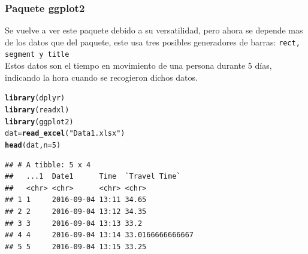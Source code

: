 \documentclass{article}\usepackage[]{graphicx}\usepackage[]{color}
\makeatletter
\newcommand{\hlnum}[1]{\textcolor[rgb]{0.686,0.059,0.569}{#1}}%
\newcommand{\hlstr}[1]{\textcolor[rgb]{0.192,0.494,0.8}{#1}}%
\newcommand{\hlstd}[1]{\textcolor[rgb]{0.345,0.345,0.345}{#1}}%
\newcommand{\hlkwb}[1]{\textcolor[rgb]{0.69,0.353,0.396}{#1}}%
\newcommand{\hlkwc}[1]{\textcolor[rgb]{0.333,0.667,0.333}{#1}}%
\newcommand{\hlkwd}[1]{\textcolor[rgb]{0.737,0.353,0.396}{\textbf{#1}}}%
\newenvironment{kframe}{%
 \def\at@end@of@kframe{}%
 \ifinner\ifhmode%
  \def\at@end@of@kframe{\end{minipage}}%
  \begin{minipage}{\columnwidth}%
 \fi\fi%
 \def\FrameCommand##1{\hskip\@totalleftmargin \hskip-\fboxsep
 \colorbox{shadecolor}{##1}\hskip-\fboxsep
     \hskip-\linewidth \hskip-\@totalleftmargin \hskip\columnwidth}%
 \MakeFramed {\advance\hsize-\width
   \@totalleftmargin\z@ \linewidth\hsize
   \@setminipage}}%
 {\par\unskip\endMakeFramed%
 \at@end@of@kframe}
\newenvironment{knitrout}{}{} %
\makeatother
\begin{document}
\subsubsection{Paquete ggplot2}
Se vuelve a ver este paquete\cite{docu_ggplot2}
debido a su versatilidad, pero ahora se depende mas de los datos que del paquete, este usa tres posibles generadores de barras: \texttt{rect, segment y title}~\\
Estos datos son el tiempo en movimiento de una persona durante 5 d\'ias, indicando la hora cuando se recogieron dichos datos.
\begin{knitrout}
\color{fgcolor}\begin{kframe}
\begin{alltt}
\hlkwd{library}\hlstd{(dplyr)}
\hlkwd{library}\hlstd{(readxl)}
\hlkwd{library}\hlstd{(ggplot2)}
\hlstd{dat} \hlkwb{=} \hlkwd{read_excel}\hlstd{(}\hlstr{"Data1.xlsx"}\hlstd{)}
\hlkwd{head}\hlstd{(dat,} \hlkwc{n}\hlstd{=}\hlnum{5}\hlstd{)}
\end{alltt}
\begin{verbatim}
## # A tibble: 5 x 4
##   ...1  Date1      Time  `Travel Time`   
##   <chr> <chr>      <chr> <chr>           
## 1 1     2016-09-04 13:11 34.65           
## 2 2     2016-09-04 13:12 34.35           
## 3 3     2016-09-04 13:13 33.2            
## 4 4     2016-09-04 13:14 33.0166666666667
## 5 5     2016-09-04 13:15 33.25
\end{verbatim}
\end{kframe}
\end{knitrout}
\end{document}
